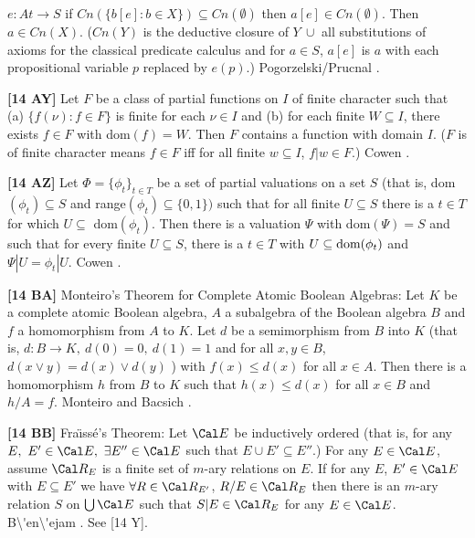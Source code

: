 $e: At\rightarrow S$ if $Cn(\{ b[e]: b\in X\})\subseteq Cn(\emptyset)$
then $a[e]\in Cn(\emptyset)$.  Then $a\in Cn(X)$. ($Cn(Y)$ is the
deductive closure of $Y\ \cup$ all substitutions of axioms for the
classical predicate calculus and for $a\in S$, $a[e]$ is $a$ with each
propositional variable $p$ replaced by $e(p)$.)  \ac{Pogorzelski/Prucnal}
\cite{1974}.
\smallskip
\item{}{\bf [14 AY]} Let $F$ be a class of partial functions on $I$ of
finite character such that (a) $\{f(\nu): f\in F\}$ is finite for each
$\nu\in I$ and (b) for each finite $W\subseteq I$, there exists $f\in F$
with dom$(f) = W$. Then $F$ contains a function with domain $I$. ($F$ is
of finite character means $f\in F$ iff for all finite $w\subseteq I$,
$f|w\in F$.)  \ac{Cowen} \cite{1973}.
\smallskip
\item{}{\bf [14 AZ]}  Let $\Phi  = \{\phi_{t}\}_{t\in T}$ be a set of
partial valuations on a set $S$ (that is, dom$(\phi_{t})\subseteq S$ and
range$(\phi_{t})\subseteq \{0,1\})$ such  that for all finite
$U\subseteq S$ there is a $t\in T$ for which $U \subseteq$ dom$(\phi_{t})$.
Then there is a valuation $\Psi$ with dom$(\Psi) = S$ and such that for
every finite $U\subseteq S$, there is a $t\in T$ with $U\subseteq
\hbox{dom}(\phi_{t})$ and $\Psi|U = \phi_{t}| U$.  \ac{Cowen} \cite{1973}.
\smallskip
\item{}{\bf [14 BA]} Monteiro's Theorem for Complete Atomic Boolean
Algebras:  Let $K$ be a complete atomic Boolean algebra,
$A$ a subalgebra of the Boolean algebra $B$ and $f$ a homomorphism from
$A$ to $K$.  Let $d$ be a semimorphism from $B$ into $K$ (that is, $d :
B \to K,\ d(0) = 0,\ d(1) = 1$ and for all $x, y\in B$, $d(x \lor
y) = d(x) \lor d(y)$ ) with $f(x) \le d(x)$ for all $x \in A$.  Then
there is a homomorphism $h$ from $B$ to $K$ such that $h(x) \le d(x)$
for all $x \in B$ and $h/A = f$.  \ac{Monteiro} \cite{1965} and \ac{Bacsich}
\cite{1972a}. 
\smallskip
\item{}{\bf [14 BB]} Fra\"\i ss\'e's Theorem:  Let $\Cal E$ be inductively
ordered (that is, for any $E,\ E'\in\Cal E,\ \exists E''\in\Cal E$
such that $E\cup E'\subseteq E''$.) For any $E\in\Cal E$, assume
$\Cal R_E$ is a finite set of $m$-ary relations on $E$.  If for any $E$,
$E'\in\Cal E$ with $E\subseteq E'$ we have $\forall R\in\Cal R_{E'}$,
$R/E \in \Cal R_E$ then there is an $m$-ary relation $S$ on
$\bigcup\Cal E$ such that $S|E \in\Cal R_E$ for any $E\in\Cal E$.
\ac{B\'en\'ejam} \cite{1970}. See [14 Y]. 
\smallskip
